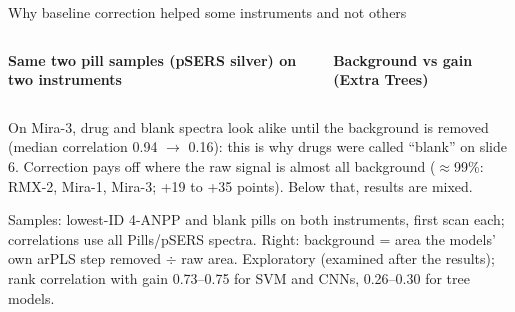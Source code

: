 \documentclass[aspectratio=169,10pt]{beamer}
\newcommand{\takeaway}[1]{%
  \par\vspace{2pt}\noindent\colorbox{cTake}{\parbox{\dimexpr\textwidth-2\fboxsep\relax}{\small #1}}}
\newcommand{\src}[1]{{\par\vspace{1pt}\tiny\color{cInk2}#1\par}}
\begin{document}
\begin{frame}{Why baseline correction helped some instruments and not others}
\begin{columns}[T,onlytextwidth]
\centering
\scriptsize\textbf{Same two pill samples (pSERS silver) on two instruments}\par\smallskip

\centering
\scriptsize\textbf{Background vs gain (Extra Trees)}\par\smallskip

\end{columns}
\takeaway{On Mira-3, drug and blank spectra look alike until the background is removed (median correlation 0.94 $\to$ 0.16): this is why drugs were called ``blank'' on slide 6. Correction pays off where the raw signal is almost all background ($\approx$99\%: RMX-2, Mira-1, Mira-3; +19 to +35 points). Below that, results are mixed.}
\src{Samples: lowest-ID 4-ANPP and blank pills on both instruments, first scan each; correlations use all Pills/pSERS spectra. Right: background = area the models' own arPLS step removed $\div$ raw area. Exploratory (examined after the results); rank correlation with gain 0.73--0.75 for SVM and CNNs, 0.26--0.30 for tree models.}
\end{frame}
\end{document}
